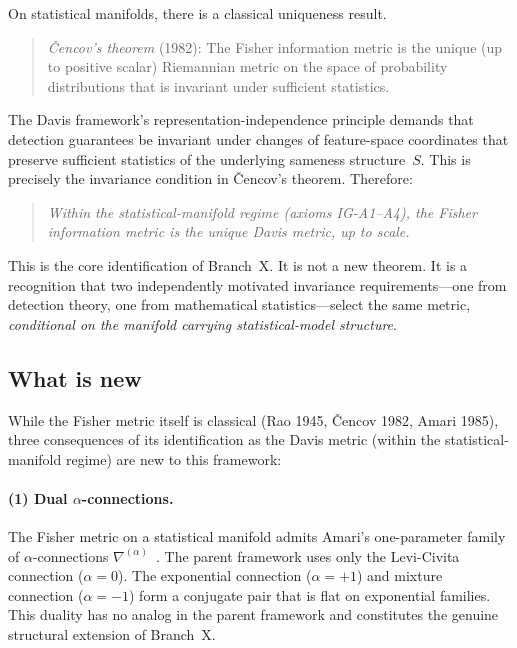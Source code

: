 \documentclass[11pt]{article}
\theoremstyle{remark}
\begin{document}
On statistical manifolds, there is a classical uniqueness result.

\begin{quote}
\emph{\v{C}encov's theorem} (1982): The Fisher information metric is the unique
(up to positive scalar) Riemannian metric on the space of probability
distributions that is invariant under sufficient statistics.
\end{quote}

The Davis framework's representation-independence principle demands that
detection guarantees be invariant under changes of feature-space coordinates
that preserve sufficient statistics of the underlying sameness structure~$S$.
This is precisely the invariance condition in \v{C}encov's theorem.  Therefore:

\begin{quote}
\emph{Within the statistical-manifold regime (axioms IG-A1--A4),
the Fisher information metric is the unique Davis metric, up to scale.}
\end{quote}

This is the core identification of Branch~X.  It is not a new theorem.  It is
a recognition that two independently motivated invariance requirements---one
from detection theory, one from mathematical statistics---select the same
metric, \emph{conditional on the manifold carrying statistical-model structure}.

\subsection{What is new}

While the Fisher metric itself is classical (Rao 1945, \v{C}encov 1982, Amari
1985), three consequences of its identification as the Davis metric
(within the statistical-manifold regime) are new to this framework:

\paragraph{(1) Dual $\alpha$-connections.}
The Fisher metric on a statistical manifold admits Amari's one-parameter family
of $\alpha$-connections $\nabla^{(\alpha)}$~\cite{amari2000}.  The parent
framework uses only the Levi-Civita connection ($\alpha = 0$).  The exponential
connection ($\alpha = +1$) and mixture connection ($\alpha = -1$) form a
conjugate pair that is flat on exponential families.  This duality has no analog
in the parent framework and constitutes the genuine structural extension of
Branch~X.
\end{document}
